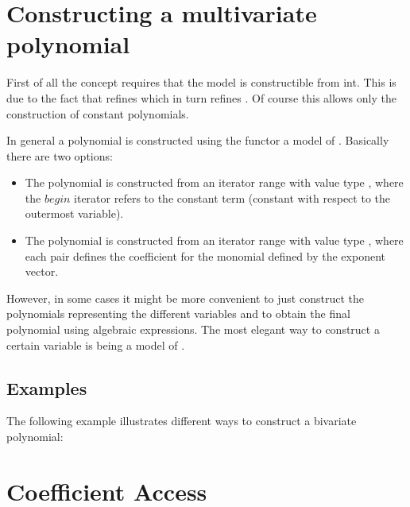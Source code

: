 \section{Constructing a multivariate polynomial}

First of all the concept  requires that the model is 
constructible from int. This is due to the fact that  
refines  which in turn refines 
. Of course this allows only the construction of 
constant polynomials. 

In general a polynomial is constructed using the functor 
 a model of 
.  Basically there are two options:
\begin{itemize}
\item The polynomial is constructed from an iterator range with value type 
, 
where the $begin$ iterator refers to the constant term 
(constant with respect to the outermost variable). 
\item The polynomial is constructed from an iterator range with value type 
,
where each pair defines the coefficient for the monomial defined by 
the exponent vector. 
\end{itemize}

However, in some cases it might be more convenient to just construct 
the polynomials representing the different variables and to obtain the 
final polynomial using 
algebraic expressions. The most elegant way to construct a certain variable is 
 being a model of 
. 

\subsection{Examples}

The following example illustrates different ways to construct a 
bivariate polynomial:



\section{Coefficient Access}
 
